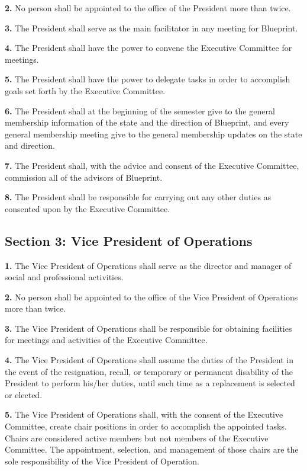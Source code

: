\documentclass{article}
\begin{document}
\textbf{2.} No person shall be appointed to the office of the President more than twice.

\textbf{3.} The President shall serve as the main facilitator in any meeting for Blueprint.

\textbf{4.} The President shall have the power to convene the Executive Committee for meetings.

\textbf{5.} The President shall have the power to delegate tasks in order to accomplish goals set forth by the Executive Committee.

\textbf{6.} The President shall at the beginning of the semester give to the general membership information of the state and the direction of Blueprint, and every general membership meeting give to the general membership updates on the state and direction.

\textbf{7.} The President shall, with the advice and consent of the Executive Committee, commission all of the advisors of Blueprint.

\textbf{8.} The President shall be responsible for carrying out any other duties as consented upon by the Executive Committee.

\subsection{Section 3: Vice President of Operations}

\textbf{1.} The Vice President of Operations shall serve as the director and manager of social and professional activities.

\textbf{2.} No person shall be appointed to the office of the Vice President of Operations more than twice.

\textbf{3.} The Vice President of Operations shall be responsible for obtaining facilities for meetings and activities of the Executive Committee.

\textbf{4.} The Vice President of Operations shall assume the duties of the President in the event of the resignation, recall, or temporary or permanent disability of the President to perform his/her duties, until such time as a replacement is selected or elected.

\textbf{5.} The Vice President of Operations shall, with the consent of the Executive Committee, create chair positions in order to accomplish the appointed tasks. Chairs are considered active members but not members of the Executive Committee. The appointment, selection, and management of those chairs are the sole responsibility of the Vice President of Operation.
\end{document}
